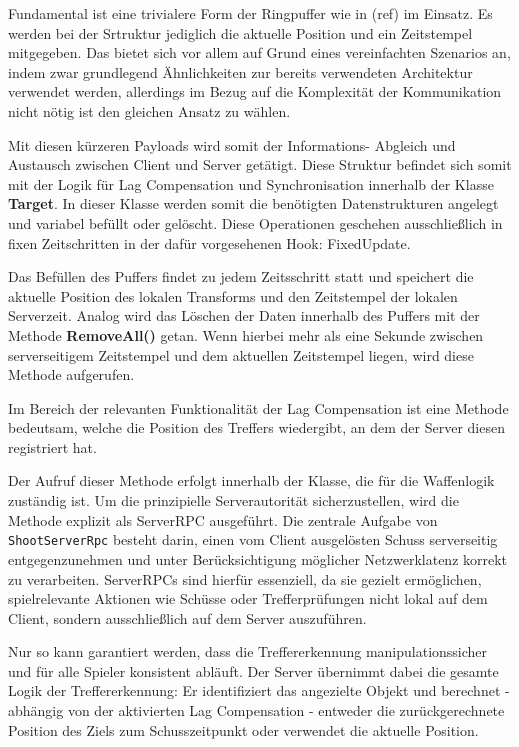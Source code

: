 \begin{enumerate}
Fundamental ist eine trivialere Form der Ringpuffer wie in (ref) im Einsatz. Es werden bei der Srtruktur jediglich die aktuelle Position und ein Zeitstempel mitgegeben. Das bietet sich vor allem auf Grund eines vereinfachten Szenarios an, indem zwar grundlegend Ähnlichkeiten zur bereits verwendeten Architektur verwendet werden, allerdings im Bezug auf die Komplexität der Kommunikation nicht nötig ist den gleichen Ansatz zu wählen. 

Mit diesen kürzeren Payloads wird somit der Informations- Abgleich und Austausch zwischen Client und Server getätigt. Diese Struktur befindet sich somit mit der Logik für Lag Compensation und Synchronisation innerhalb der Klasse \textbf{Target}. 
In dieser Klasse werden somit die benötigten Datenstrukturen angelegt und variabel befüllt oder gelöscht. Diese Operationen geschehen ausschließlich in fixen Zeitschritten in der dafür vorgesehenen Hook: FixedUpdate.

Das Befüllen des Puffers findet zu jedem Zeitsschritt statt und speichert die aktuelle Position des lokalen Transforms und den Zeitstempel der lokalen Serverzeit.
Analog wird das Löschen der Daten innerhalb des Puffers mit der Methode \textbf{RemoveAll()} getan. Wenn hierbei mehr als eine Sekunde zwischen serverseitigem Zeitstempel und dem aktuellen Zeitstempel liegen, wird diese Methode aufgerufen.

Im Bereich der relevanten Funktionalität der Lag Compensation ist eine Methode bedeutsam, welche die Position des Treffers wiedergibt, an dem der Server diesen registriert hat.

Der Aufruf dieser Methode erfolgt innerhalb der Klasse, die für die Waffenlogik zuständig ist. Um die prinzipielle Serverautorität sicherzustellen, wird die Methode explizit als ServerRPC ausgeführt. Die zentrale Aufgabe von \texttt{ShootServerRpc} besteht darin, einen vom Client ausgelösten Schuss serverseitig entgegenzunehmen und unter Berücksichtigung möglicher Netzwerklatenz korrekt zu verarbeiten. ServerRPCs sind hierfür essenziell, da sie gezielt ermöglichen, spielrelevante Aktionen wie Schüsse oder Trefferprüfungen nicht lokal auf dem Client, sondern ausschließlich auf dem Server auszuführen. 

Nur so kann garantiert werden, dass die Treffererkennung manipulationssicher und für alle Spieler konsistent abläuft. Der Server übernimmt dabei die gesamte Logik der Treffererkennung: Er identifiziert das angezielte Objekt und berechnet - abhängig von der aktivierten Lag Compensation - entweder die zurückgerechnete Position des Ziels zum Schusszeitpunkt oder verwendet die aktuelle Position. 


\end{enumerate}
